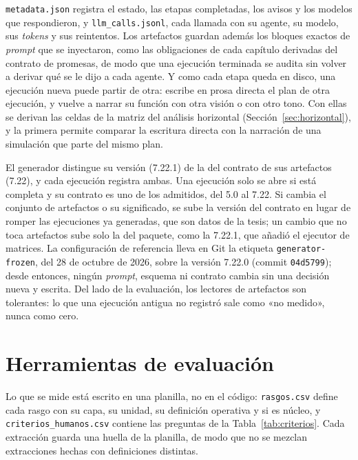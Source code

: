 \texttt{metadata.json} registra el estado, las etapas completadas, los avisos y los modelos que
respondieron, y \texttt{llm\_calls.jsonl}, cada llamada con su agente, su modelo, sus
\textit{tokens} y sus reintentos. Los artefactos guardan además los bloques exactos de
\textit{prompt} que se inyectaron, como las obligaciones de cada capítulo derivadas del contrato de
promesas, de modo que una ejecución terminada se audita sin volver a derivar qué se le dijo a cada
agente. Y como cada etapa queda en disco, una ejecución nueva puede partir de otra:
 escribe en prosa directa el plan de otra ejecución, y 
vuelve a narrar su función con otra visión o con otro tono. Con ellas se derivan las celdas de la
matriz del análisis horizontal (Sección~\ref{sec:horizontal}), y la primera permite comparar la escritura directa con la narración de una simulación
que parte del mismo plan.

El generador distingue su versión (7.22.1) de la del contrato de sus artefactos (7.22), y cada
ejecución registra ambas. Una ejecución solo se abre si está completa y su contrato es uno de los
admitidos, del 5.0 al 7.22. Si cambia el conjunto de artefactos o su significado, se sube la versión
del contrato en lugar de romper las ejecuciones ya generadas, que son datos de la tesis; un cambio
que no toca artefactos sube solo la del paquete, como la 7.22.1, que añadió el ejecutor de matrices.
La configuración de referencia lleva en Git la etiqueta \texttt{generator-frozen}, del 28 de octubre de
2026, sobre la versión 7.22.0 (commit \texttt{04d5799}); desde entonces, ningún \textit{prompt}, esquema ni contrato cambia sin una decisión nueva y
escrita. Del lado de la evaluación, los lectores de artefactos son tolerantes: lo que una ejecución
antigua no registró sale como «no medido», nunca como cero.

\section{Herramientas de evaluación}\label{sec:herramientas}

Lo que se mide está escrito en una planilla, no en el código: \texttt{rasgos.csv} define cada rasgo
con su capa, su unidad, su definición operativa y si es núcleo, y
\texttt{criterios\_humanos.csv} contiene las preguntas de la Tabla~\ref{tab:criterios}. Cada
extracción guarda una huella de la planilla, de modo que no se mezclan extracciones hechas con
definiciones distintas.

